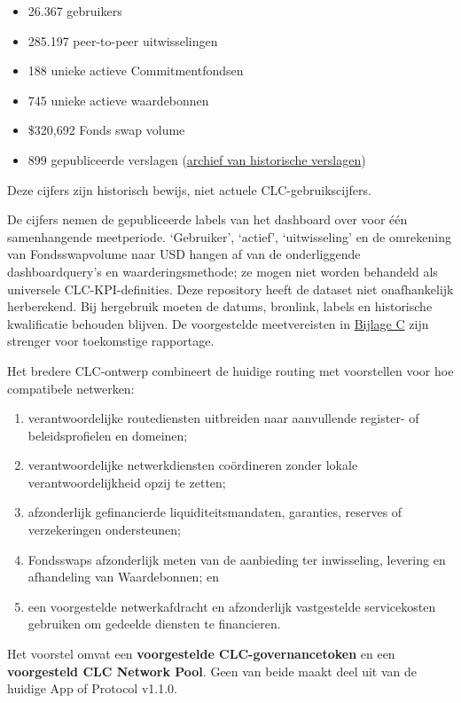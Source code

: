 \documentclass[11pt]{article}
\begin{document}
\begin{itemize}[leftmargin=*]
\item 26.367 gebruikers
\item 285.197 peer-to-peer uitwisselingen
\item 188 unieke actieve Commitmentfondsen
\item 745 unieke actieve waardebonnen
\item \$320,692 Fonds swap volume
\item 899 gepubliceerde verslagen (\href{https://sarafu.network/reports}{archief van historische verslagen})
\end{itemize}
Deze cijfers zijn historisch bewijs, niet actuele CLC-gebruikscijfers.

De cijfers nemen de gepubliceerde labels van het dashboard over voor één samenhangende meetperiode. `Gebruiker', `actief', `uitwisseling' en de omrekening van Fondsswapvolume naar USD hangen af van de onderliggende dashboardquery's en waarderingsmethode; ze mogen niet worden behandeld als universele CLC-KPI-definities. Deze repository heeft de dataset niet onafhankelijk herberekend. Bij hergebruik moeten de datums, bronlink, labels en historische kwalificatie behouden blijven. De voorgestelde meetvereisten in \href{https://docs.cosmolocal.credit/nl/white-paper/appendix-c-kpi-definitions}{Bijlage C} zijn strenger voor toekomstige rapportage.

Het bredere CLC-ontwerp combineert de huidige routing met voorstellen voor hoe compatibele netwerken:

\begin{enumerate}[leftmargin=*]
\item verantwoordelijke routediensten uitbreiden naar aanvullende register- of beleidsprofielen en domeinen;
\item verantwoordelijke netwerkdiensten coördineren zonder lokale verantwoordelijkheid opzij te zetten;
\item afzonderlijk gefinancierde liquiditeitsmandaten, garanties, reserves of verzekeringen ondersteunen;
\item Fondsswaps afzonderlijk meten van de aanbieding ter inwisseling, levering en afhandeling van Waardebonnen; en
\item een voorgestelde netwerkafdracht en afzonderlijk vastgestelde servicekosten gebruiken om gedeelde diensten te financieren.
\end{enumerate}
Het voorstel omvat een \textbf{voorgestelde CLC-governancetoken} en een \textbf{voorgesteld CLC Network Pool}. Geen van beide maakt deel uit van de huidige App of Protocol v1.1.0.
\end{document}
